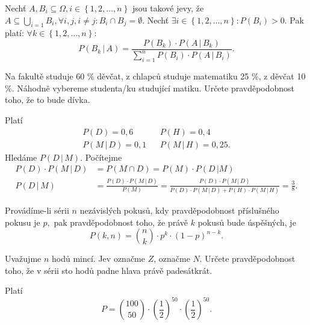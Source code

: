 \begin{veta}
    Nechť $A,B_i \subseteq \Omega, i \in \left \{ 1, 2, \dots, n \right \} $ jsou
    takové jevy, že $A\subseteq \bigcup_{i=1} B_i, \forall i,j, i\ne j: B_i\cap B_j=
    \emptyset.$ Nechť $\exists i \in \left \{ 1, 2, \dots, n \right \} : P(B_i) >0.$
    Pak platí: $\forall k\in \left \{ 1, 2, \dots, n \right \}:$
    $$P(B_k \, |\, A)=\frac{P(B_k)\cdot P(A\, |\, B_k)}{\sum_{i=1}^n P(B_i)\cdot
    P(A\, |\, B_i)}. $$
\end{veta}

\begin{priklad}
Na fakultě studuje 60 \% děvčat, z chlapců studuje matematiku 25 \%,
z děvčat 10 \%. Náhodně vybereme studenta/ku studující matiku. Určete
pravděpodobnost toho, že to bude dívka.
\end{priklad}

\begin{reseni}
Platí
\begin{align*}
P(D)=0,6 & & P(H)=0,4 \\
P(M \, | \, D)=0,1 & & P(M \, | \, H)=0,25.
\end{align*}
Hledáme $P(D \, | \, M).$ Počítejme
\begin{align*}
 P(D)\cdot P(M \, | \, D)&=P(M \cap D)=P(M)\cdot P(D \, | M)\\
 P(D \,|\, M) &= \frac{P(D)\cdot P(M \, | \, D)}{P(M)}=\frac{P(D)\cdot P(M \, | \, D)}{P(D)\cdot P(M\, | \, D)+P(H)\cdot P(M \, | \, H)}=\frac{3}{8}.
\end{align*}
\end{reseni}

\begin{veta}
    Provádíme-li sérii $n$ nezávislých pokusů, kdy pra\-vdě\-po\-dob\-nost příslušného
    pokusu je $p,$ pak pravděpodobnost toho, že právě $k$ pokusů bude úspěšných, je
    $$P(k,n)=\binom{n}{k}\cdot p^k \cdot (1-p)^{n-k}.$$
\end{veta}

\begin{priklad}
Uvažujme $n$ hodů mincí. Jev  označme $Z$,  označme $N$.
Určete pravděpodobnost toho, že v sérii sto hodů padne hlava právě padesátkrát.
\end{priklad}

\begin{reseni}
Platí
$$P=\binom{100}{50}\cdot \left ( \frac{1}{2} \right )^{50}\cdot \left ( \frac{1}{2} \right )^{50}.  $$
\end{reseni}
